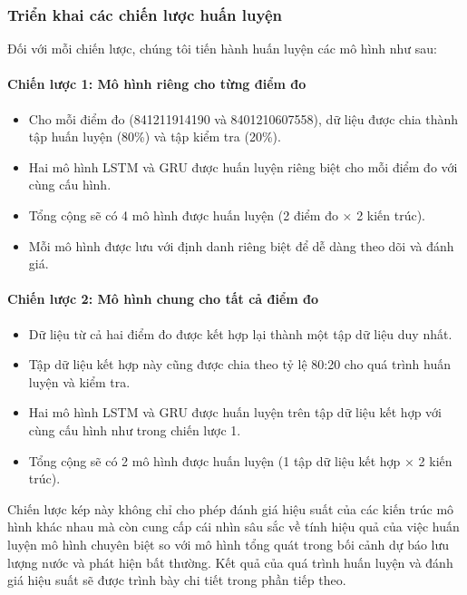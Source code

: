 \subsubsection{Triển khai các chiến lược huấn luyện}

Đối với mỗi chiến lược, chúng tôi tiến hành huấn luyện các mô hình như sau:

\paragraph{Chiến lược 1: Mô hình riêng cho từng điểm đo}
\begin{itemize}
    \item Cho mỗi điểm đo (841211914190 và 8401210607558), dữ liệu được chia thành tập huấn luyện (80\%) và tập kiểm tra (20\%).
    \item Hai mô hình LSTM và GRU được huấn luyện riêng biệt cho mỗi điểm đo với cùng cấu hình.
    \item Tổng cộng sẽ có 4 mô hình được huấn luyện (2 điểm đo × 2 kiến trúc).
    \item Mỗi mô hình được lưu với định danh riêng biệt để dễ dàng theo dõi và đánh giá.
\end{itemize}

\paragraph{Chiến lược 2: Mô hình chung cho tất cả điểm đo}
\begin{itemize}
    \item Dữ liệu từ cả hai điểm đo được kết hợp lại thành một tập dữ liệu duy nhất.
    \item Tập dữ liệu kết hợp này cũng được chia theo tỷ lệ 80:20 cho quá trình huấn luyện và kiểm tra.
    \item Hai mô hình LSTM và GRU được huấn luyện trên tập dữ liệu kết hợp với cùng cấu hình như trong chiến lược 1.
    \item Tổng cộng sẽ có 2 mô hình được huấn luyện (1 tập dữ liệu kết hợp × 2 kiến trúc).
\end{itemize}

Chiến lược kép này không chỉ cho phép đánh giá hiệu suất của các kiến trúc mô hình khác nhau mà còn cung cấp cái nhìn sâu sắc về tính hiệu quả của việc huấn luyện mô hình chuyên biệt so với mô hình tổng quát trong bối cảnh dự báo lưu lượng nước và phát hiện bất thường. Kết quả của quá trình huấn luyện và đánh giá hiệu suất sẽ được trình bày chi tiết trong phần tiếp theo.


